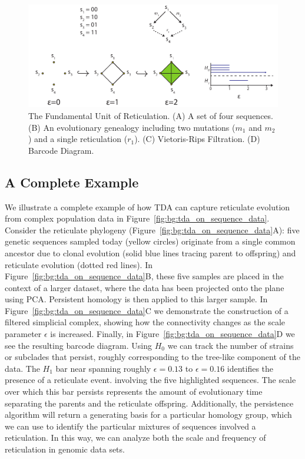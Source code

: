 \begin{figure}
\centering
\includegraphics[width=\textwidth]{./fig/background/four_gamete_test.pdf}
\caption[Fundamental Unit of Reticulation]{The Fundamental Unit of Reticulation. (A) A set of four sequences. (B) An evolutionary genealogy including two mutations ($m_1$ and $m_2$) and a single reticulation ($r_1$). (C) Vietoris-Rips Filtration. (D) Barcode Diagram.}
\label{fig:bg:four_gamete_test}
\end{figure}

\subsection{A Complete Example}
\label{bg:top4bio:full_example}

We illustrate a complete example of how TDA can capture reticulate evolution from complex population data in Figure~\ref{fig:bg:tda_on_sequence_data}.
Consider the reticulate phylogeny (Figure~\ref{fig:bg:tda_on_sequence_data}A): five genetic sequences sampled today (yellow circles) originate from a single common ancestor due to clonal evolution (solid blue lines tracing parent to offspring) and reticulate evolution (dotted red lines).
In Figure~\ref{fig:bg:tda_on_sequence_data}B, these five samples are placed in the context of a larger dataset, where the data has been projected onto the plane using PCA.
Persistent homology is then applied to this larger sample.
In Figure~\ref{fig:bg:tda_on_sequence_data}C we demonstrate the construction of a filtered simplicial complex, showing how the connectivity changes as the scale parameter $\epsilon$ is increased.
Finally, in Figure~\ref{fig:bg:tda_on_sequence_data}D we see the resulting barcode diagram.
Using $H_0$ we can track the number of strains or subclades that persist, roughly corresponding to the tree-like component of the data.
The $H_1$ bar near spanning roughly $\epsilon=0.13$ to $\epsilon=0.16$ identifies the presence of a reticulate event. involving the five highlighted sequences.
The scale over which this bar persists represents the amount of evolutionary time separating the parents and the reticulate offspring.
Additionally, the persistence algorithm will return a generating basis for a particular homology group, which we can use to identify the particular mixtures of sequences involved a reticulation.
In this way, we can analyze both the scale and frequency of reticulation in genomic data sets.

